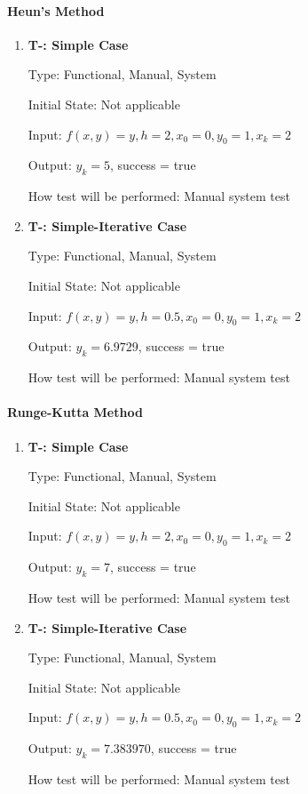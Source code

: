 \documentclass[12pt, titlepage]{article}
\newcounter{tnum} %
\begin{document}
\paragraph{Heun's Method}
\begin{enumerate}

\item{\textbf{T-\thetnum \label{t-heun_simple}: Simple Case}}

Type: Functional, Manual, System %
					
Initial State: Not applicable
					
Input: $f(x, y) = y, h = 2, x_0 = 0, y_0 = 1, x_k = 2$
					
Output: $y_k = 5$, success = true
					
How test will be performed: Manual system test

\item{\textbf{T-\thetnum \label{t-heun_simpleiterative}: Simple-Iterative Case}}

Type: Functional, Manual, System %
					
Initial State: Not applicable
					
Input: $f(x, y) = y, h = 0.5, x_0 = 0, y_0 = 1, x_k = 2$
					
Output: $y_k = 6.9729$, success = true
					
How test will be performed: Manual system test

\end{enumerate}

\paragraph{Runge-Kutta Method}
\begin{enumerate}

\item{\textbf{T-\thetnum \label{t-rk_simple}: Simple Case}}

Type: Functional, Manual, System %
					
Initial State: Not applicable
					
Input: $f(x, y) = y, h = 2, x_0 = 0, y_0 = 1, x_k = 2$
					
Output: $y_k = 7$, success = true
					
How test will be performed: Manual system test

\item{\textbf{T-\thetnum \label{t-rk_simpleiterative}: Simple-Iterative Case}}

Type: Functional, Manual, System %
					
Initial State: Not applicable
					
Input: $f(x, y) = y, h = 0.5, x_0 = 0, y_0 = 1, x_k = 2$
					
Output: $y_k = 7.383970$, success = true
					
How test will be performed: Manual system test

\end{enumerate}
\end{document}
